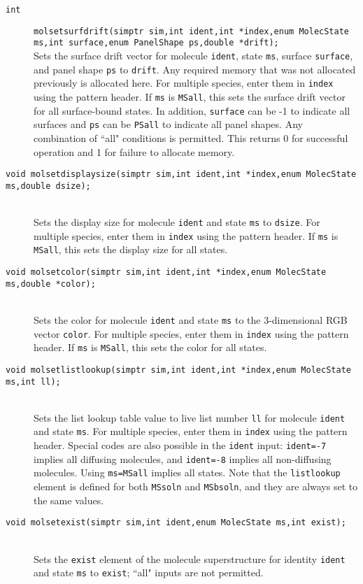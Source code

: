 \documentclass {book}
\newcommand {\ttt} {\texttt}
\begin{document}
\begin{description}
\item[\ttt{int}]
\ttt{molsetsurfdrift(simptr sim,int ident,int *index,enum MolecState ms,int surface,enum PanelShape ps,double *drift);}
\hfill \\
Sets the surface drift vector for molecule \ttt{ident}, state \ttt{ms}, surface \ttt{surface}, and panel shape \ttt{ps} to \ttt{drift}. Any required memory that was not allocated previously is allocated here. For multiple species, enter them in \ttt{index} using the pattern header. If \ttt{ms} is \ttt{MSall}, this sets the surface drift vector for all surface-bound states. In addition, \ttt{surface} can be -1 to indicate all surfaces and \ttt{ps} can be \ttt{PSall} to indicate all panel shapes. Any combination of ``all" conditions is permitted. This returns 0 for successful operation and 1 for failure to allocate memory.

\item[\ttt{void molsetdisplaysize(simptr sim,int ident,int *index,enum MolecState ms,double dsize);}]
\hfill \\
Sets the display size for molecule \ttt{ident} and state \ttt{ms} to \ttt{dsize}. For multiple species, enter them in \ttt{index} using the pattern header. If \ttt{ms} is \ttt{MSall}, this sets the display size for all states.

\item[\ttt{void molsetcolor(simptr sim,int ident,int *index,enum MolecState ms,double *color);}]
\hfill \\
Sets the color for molecule \ttt{ident} and state \ttt{ms} to the 3-dimensional RGB vector \ttt{color}. For multiple species, enter them in \ttt{index} using the pattern header. If \ttt{ms} is \ttt{MSall}, this sets the color for all states.

\item[\ttt{void molsetlistlookup(simptr sim,int ident,int *index,enum MolecState ms,int ll);}]
\hfill \\
Sets the list lookup table value to live list number \ttt{ll} for molecule \ttt{ident} and state \ttt{ms}. For multiple species, enter them in \ttt{index} using the pattern header. Special codes are also possible in the \ttt{ident} input: \ttt{ident=-7} implies all diffusing molecules, and \ttt{ident=-8} implies all non-diffusing molecules. Using \ttt{ms=MSall} implies all states. Note that the \ttt{listlookup} element is defined for both \ttt{MSsoln} and \ttt{MSbsoln}, and they are always set to the same values.

\item[\ttt{void molsetexist(simptr sim,int ident,enum MolecState ms,int exist);}]
\hfill \\
Sets the \ttt{exist} element of the molecule superstructure for identity \ttt{ident} and state \ttt{ms} to \ttt{exist}; ``all" inputs are not permitted.


\end{description}
\end{document}
